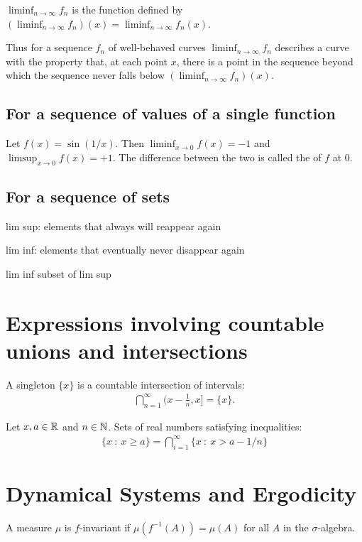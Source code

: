 $\liminf_{n\to\infty} f_n$ is the function defined by $(\liminf_{n\to\infty} f_n)(x) = \liminf_{n\to\infty} f_n(x)$.

Thus for a sequence $f_n$ of well-behaved curves $\liminf_{n\to\infty} f_n$ describes a curve with the property
that, at each point $x$, there is a point in the sequence beyond which the sequence never falls
below $(\liminf_{n\to\infty} f_n)(x)$.

\subsection{For a sequence of values of a single function}
Let $f(x) = \sin(1/x)$. Then $\liminf_{x \to 0} f(x) = -1$ and $\limsup_{x\to 0} f(x) = +1$. The difference
between the two is called the  of $f$ at $0$.

\subsection{For a sequence of sets}

lim sup: elements that always will reappear again

lim inf: elements that eventually never disappear again

lim inf subset of lim sup


\section*{Expressions involving countable unions and intersections}

A singleton $\{x\}$ is a countable intersection of intervals:
    \begin{align*}
      \bigcap_{n=1}^\infty \Big(x -\frac{1}{n}, x\Big] = \{x\}.
    \end{align*}

Let $x, a \in \mathbb{R}$ and $n \in \mathbb{N}$. Sets of real numbers satisfying inequalities:
\begin{align*}
  \big\{x ~:~ x \geq a\big\} = \bigcap_{i=1}^\infty \big\{x ~:~ x > a - 1/n\big\}
\end{align*}

\section{Dynamical Systems and Ergodicity}

\begin{definition}
  A measure $\mu$ is $f$-invariant if $\mu(f^{-1}(A)) = \mu(A)$ for all $A$ in the $\sigma$-algebra.
\end{definition}

